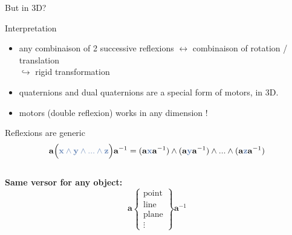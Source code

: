 \begin{frame}{But in 3D?}
\end{frame}


\begin{frame}{Interpretation}
    \begin{center}
    \end{center}
    \begin{itemize}
        \item any combinaison of 2 successive reflexions $\leftrightarrow$ combinaison of rotation / translation \\
              $\hookrightarrow$ rigid transformation
        \item quaternions and dual quaternions are a special form of motors, in 3D.
        \item motors (double reflexion) works in any dimension !
    \end{itemize}
\end{frame}



\begin{frame}{Reflexions are generic}
    $$ \mathbf{a}\Big( \textcolor{blue}{\mathbf{x} \wedge \mathbf{y} \wedge  ... \wedge \mathbf{z}} \Big) \mathbf{a}^{-1}
        = (\mathbf{a}\textcolor{blue}{\mathbf{x}} \mathbf{a}^{-1}) \wedge (\mathbf{a}\textcolor{blue}{\mathbf{y}} \mathbf{a}^{-1}) \wedge  ... \wedge  (\mathbf{a}\textcolor{blue}{\mathbf{z}} \mathbf{a}^{-1})$$
    ~\\
    \textbf{Same versor for any object:}
    $$
        \mathbf{a}
        \left\lbrace
        \begin{array}{c}
            \text{point} \\
            \text{line}  \\
            \text{plane} \\
            \vdots
        \end{array}
        \right\rbrace
        \mathbf{a}^{-1}
    $$
\end{frame}






